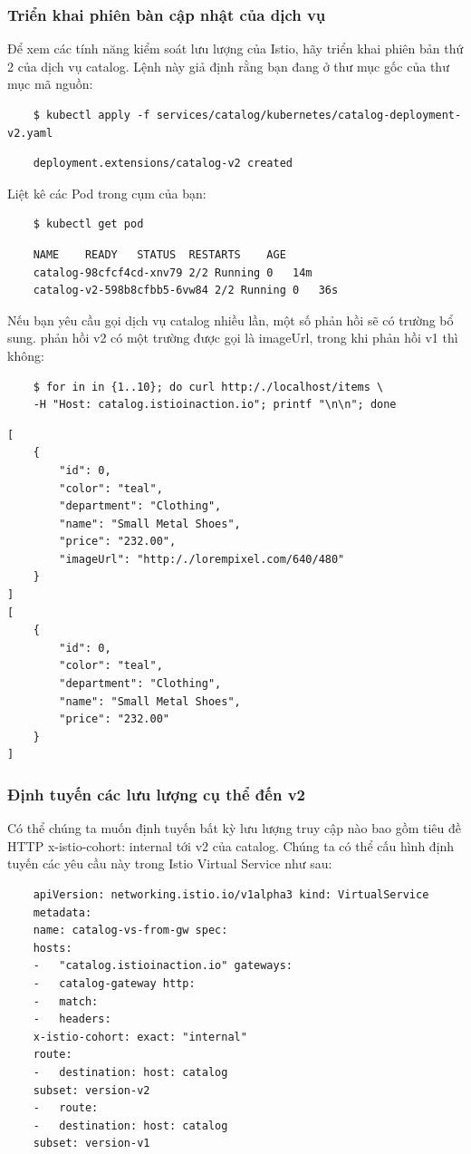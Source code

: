 \documentclass[12pt,a4paper]{report}
\begin{document}
			\subsubsection{Triển khai phiên bàn cập nhật của dịch vụ}
\hspace{0.6cm}Để xem các tính năng kiểm soát lưu lượng của Istio, hãy triển khai phiên bản thứ 2 của dịch vụ catalog. Lệnh này giả định rằng bạn đang ở thư mục gốc của thư mục mã nguồn:
\begin{lstlisting}
	$ kubectl apply -f services/catalog/kubernetes/catalog-deployment-v2.yaml 
\end{lstlisting}
\begin{verbatim}
	deployment.extensions/catalog-v2 created
\end{verbatim}

Liệt kê các Pod trong cụm của bạn:
\begin{lstlisting}
	$ kubectl get pod
\end{lstlisting}
\begin{verbatim}
	NAME	READY	STATUS	RESTARTS	AGE
	catalog-98cfcf4cd-xnv79	2/2	Running	0	14m
	catalog-v2-598b8cfbb5-6vw84	2/2	Running	0	36s
\end{verbatim}

Nếu bạn yêu cầu gọi dịch vụ catalog nhiều lần, một số phản hồi sẽ có trường bổ sung. phản hồi v2 có một trường được gọi là imageUrl, trong khi phản hồi v1 thì không:
\begin{lstlisting}
	$ for in in {1..10}; do curl http:/./localhost/items \
	-H "Host: catalog.istioinaction.io"; printf "\n\n"; done
\end{lstlisting}
\begin{lstlisting}
[
	{
		"id": 0,
		"color": "teal",
		"department": "Clothing",
		"name": "Small Metal Shoes",
		"price": "232.00",
		"imageUrl": "http:/./lorempixel.com/640/480"
	}
]
[
	{
		"id": 0,
		"color": "teal",
		"department": "Clothing",
		"name": "Small Metal Shoes",
		"price": "232.00"
	}
]
\end{lstlisting}
			\subsubsection{Định tuyến các lưu lượng cụ thể đến v2}
\hspace{0.6cm}Có thể chúng ta muốn định tuyến bất kỳ lưu lượng truy cập nào bao gồm tiêu đề HTTP x-istio-cohort: internal tới v2 của catalog. Chúng ta có thể cấu hình định tuyến các yêu cầu này trong Istio Virtual Service như sau:
\begin{lstlisting}
	apiVersion: networking.istio.io/v1alpha3 kind: VirtualService
	metadata:
	name: catalog-vs-from-gw spec:
	hosts:
	-	"catalog.istioinaction.io" gateways:
	-	catalog-gateway http:
	-	match:
	-	headers:
	x-istio-cohort: exact: "internal"
	route:
	-	destination: host: catalog
	subset: version-v2
	-	route:
	-	destination: host: catalog
	subset: version-v1
\end{lstlisting}
\end{document}
